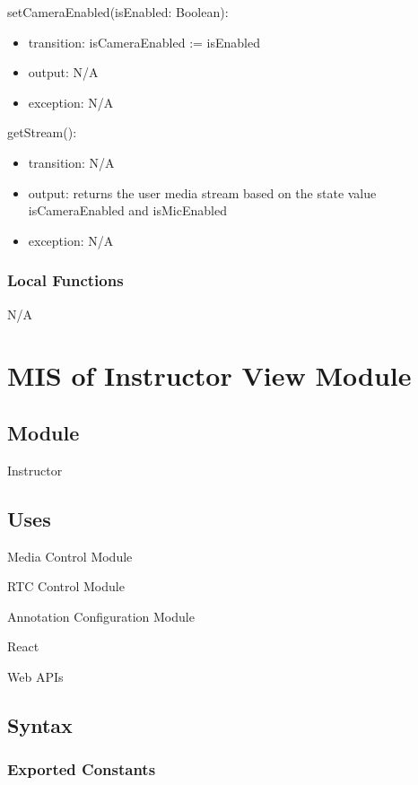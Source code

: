 \documentclass[12pt, titlepage]{article}
\begin{document}
\noindent setCameraEnabled(isEnabled: Boolean):
\begin{itemize}
\item transition: isCameraEnabled := isEnabled
\item output: N/A
\item exception: N/A
\end{itemize}


\noindent getStream():
\begin{itemize}
\item transition: N/A
\item output: returns the user media stream based on the state value
  isCameraEnabled and isMicEnabled
\item exception: N/A
\end{itemize}

\subsubsection{Local Functions}

N/A


\section{MIS of Instructor View Module} \label{sec:instrcview}

\subsection{Module}

Instructor

\subsection{Uses}

\noindent Media Control Module

\noindent RTC Control Module

\noindent Annotation Configuration Module

\noindent React

\noindent Web APIs

\subsection{Syntax}

\subsubsection{Exported Constants}
\end{document}
